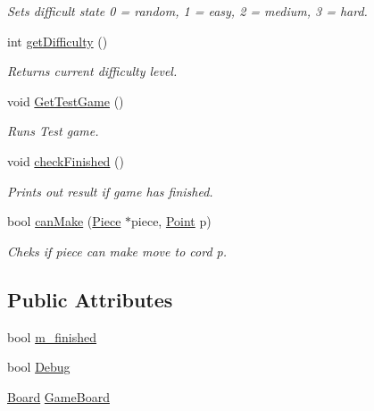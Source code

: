 \begin{DoxyCompactItemize}
\begin{DoxyCompactList}\small\item\em Sets difficult state 0 = random, 1 = easy, 2 = medium, 3 = hard. \end{DoxyCompactList}\item 
\hypertarget{class_game_a2c0efe888e453a7fc0e644503fbd6316}{int \hyperlink{class_game_a2c0efe888e453a7fc0e644503fbd6316}{get\-Difficulty} ()}\label{class_game_a2c0efe888e453a7fc0e644503fbd6316}

\begin{DoxyCompactList}\small\item\em Returns current difficulty level. \end{DoxyCompactList}\item 
\hypertarget{class_game_a1f47238d93728540edb7940a80a9db89}{void \hyperlink{class_game_a1f47238d93728540edb7940a80a9db89}{Get\-Test\-Game} ()}\label{class_game_a1f47238d93728540edb7940a80a9db89}

\begin{DoxyCompactList}\small\item\em Runs Test game. \end{DoxyCompactList}\item 
\hypertarget{class_game_ae5be70ea28f2ec151cd93e86086f23a9}{void \hyperlink{class_game_ae5be70ea28f2ec151cd93e86086f23a9}{check\-Finished} ()}\label{class_game_ae5be70ea28f2ec151cd93e86086f23a9}

\begin{DoxyCompactList}\small\item\em Prints out result if game has finished. \end{DoxyCompactList}\item 
\hypertarget{class_game_a37edad1c1ded84b1735653f809ccb585}{bool \hyperlink{class_game_a37edad1c1ded84b1735653f809ccb585}{can\-Make} (\hyperlink{class_piece}{Piece} $\ast$piece, \hyperlink{struct_point}{Point} p)}\label{class_game_a37edad1c1ded84b1735653f809ccb585}

\begin{DoxyCompactList}\small\item\em Cheks if piece can make move to cord p. \end{DoxyCompactList}\end{DoxyCompactItemize}
\subsection*{Public Attributes}
\begin{DoxyCompactItemize}
\item 
bool \hyperlink{class_game_aee0b70deb19422d35b2061beb339bdf8}{m\-\_\-finished}
\item 
bool \hyperlink{class_game_ad79740c2d2fa299cf322bf6ea322d9aa}{Debug}
\item 
\hyperlink{class_board}{Board} \hyperlink{class_game_aeb67bc4fc06221330cfd7c862c85b66d}{Game\-Board}
\end{DoxyCompactItemize}
